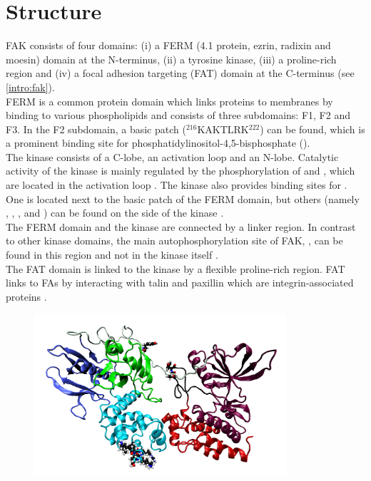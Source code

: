 \section{Structure}
FAK consists of four domains: (i) a FERM (4.1 protein, ezrin, radixin and moesin) domain at the N-terminus, (ii) a tyrosine kinase, (iii) a proline-rich region and (iv) a focal adhesion targeting (FAT) domain at the C-terminus (see \autoref{intro:fak}).\\
FERM is a common protein domain which links proteins to membranes by binding to various phospholipids \autocite{fermdomain} and consists of three subdomains: F1, F2 and F3. In the F2 subdomain, a basic patch ($^{216}$KAKTLRK$^{222}$) can be found, which is a prominent binding site for phosphatidylinositol-4,5-bisphosphate (\pip).\\
The kinase consists of a C-lobe, an activation loop and an N-lobe. Catalytic activity of the kinase is mainly regulated by the phosphorylation of  and , which are located in the activation loop \autocite{tyrosinePhosphor}. The kinase also provides binding sites for \pip{}. One is located next to the basic patch of the FERM domain, but others (namely , , ,  and ) can be found on the side of the kinase \autocites{pap002}{pap002Exp}.\\
The FERM domain and the kinase are connected by a linker region. In contrast to other kinase domains, the main autophosphorylation site of FAK, , can be found in this region and not in the kinase itself \autocite{pap001}.\\
The FAT domain is linked to the kinase by a flexible proline-rich region. FAT links to FAs by interacting with talin and paxillin which are integrin-associated proteins \autocite{fatdomain}.
%
%
%
\begin{figure}
	\centering
	\includegraphics[height=6cm]{figures/introduction/fak}
	\label{intro:fak}
\end{figure}
%
%
%
